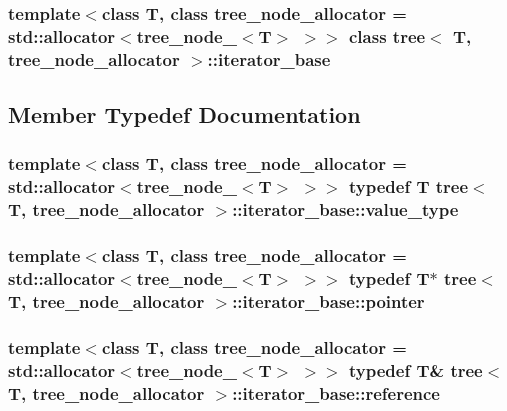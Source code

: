 \subsubsection*{template$<$class T, class tree\_\-node\_\-allocator = std::allocator$<$tree\_\-node\_\-$<$T$>$ $>$$>$ class tree$<$ T, tree\_\-node\_\-allocator $>$::iterator\_\-base}



\subsection{Member Typedef Documentation}
\hypertarget{classtree_1_1iterator__base_ab430bec9e607ae24cdd2bdffe3faf70}{
\subsubsection{\setlength{\rightskip}{0pt plus 5cm}template$<$class T, class tree\_\-node\_\-allocator = std::allocator$<$tree\_\-node\_\-$<$T$>$ $>$$>$ typedef T {\bf tree}$<$ T, tree\_\-node\_\-allocator $>$::{\bf iterator\_\-base::value\_\-type}}}
\label{classtree_1_1iterator__base_ab430bec9e607ae24cdd2bdffe3faf70}


\hypertarget{classtree_1_1iterator__base_0665bed45269b6f7b97809ea9920008e}{
\subsubsection{\setlength{\rightskip}{0pt plus 5cm}template$<$class T, class tree\_\-node\_\-allocator = std::allocator$<$tree\_\-node\_\-$<$T$>$ $>$$>$ typedef T$\ast$ {\bf tree}$<$ T, tree\_\-node\_\-allocator $>$::{\bf iterator\_\-base::pointer}}}
\label{classtree_1_1iterator__base_0665bed45269b6f7b97809ea9920008e}


\hypertarget{classtree_1_1iterator__base_063faf883017de195e7e72cf55be6914}{
\subsubsection{\setlength{\rightskip}{0pt plus 5cm}template$<$class T, class tree\_\-node\_\-allocator = std::allocator$<$tree\_\-node\_\-$<$T$>$ $>$$>$ typedef T\& {\bf tree}$<$ T, tree\_\-node\_\-allocator $>$::{\bf iterator\_\-base::reference}}}
\label{classtree_1_1iterator__base_063faf883017de195e7e72cf55be6914}


